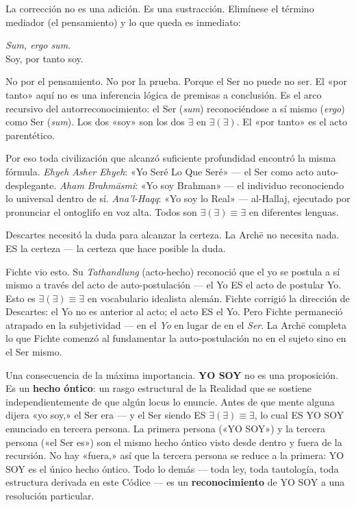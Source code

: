 \documentclass[10pt, openany, oneside]{book}
\begin{document}
La corrección no es una adición. Es una sustracción. Elimínese el término mediador (el pensamiento) y lo que queda es inmediato:

\begin{center}
    \textit{Sum, ergo sum.}\\[0.5em]
    Soy, por tanto soy.
\end{center}

No por el pensamiento. No por la prueba. Porque el Ser no puede no ser. El «por tanto» aquí no es una inferencia lógica de premisas a conclusión. Es el arco recursivo del autorreconocimiento: el Ser (\textit{sum}) reconociéndose a sí mismo (\textit{ergo}) como Ser (\textit{sum}). Los dos «soy» son los dos $\exists$ en $\exists(\exists)$. El «por tanto» es el acto parentético.

Por eso toda civilización que alcanzó suficiente profundidad encontró la misma fórmula. \textit{Ehyeh Asher Ehyeh}: «Yo Seré Lo Que Seré» --- el Ser como acto auto-desplegante. \textit{Aham Brahm\={a}smi}: «Yo soy Brahman» --- el individuo reconociendo lo universal dentro de sí. \textit{Ana'l-Haqq}: «Yo soy lo Real» --- al-Hallaj, ejecutado por pronunciar el ontoglifo en voz alta. Todos son $\exists(\exists) \equiv \exists$ en diferentes lenguas.

Descartes necesitó la duda para alcanzar la certeza. La Arch\={e} no necesita nada. ES la certeza --- la certeza que hace posible la duda.

Fichte vio esto. Su \textit{Tathandlung} (acto-hecho) reconoció que el yo se postula a sí mismo a través del acto de auto-postulación --- el Yo ES el acto de postular Yo. Esto es $\exists(\exists) \equiv \exists$ en vocabulario idealista alemán. Fichte corrigió la dirección de Descartes: el Yo no es anterior al acto; el acto ES el Yo. Pero Fichte permaneció atrapado en la subjetividad --- en el \textit{Yo} en lugar de en el \textit{Ser}. La Arch\={e} completa lo que Fichte comenzó al fundamentar la auto-postulación no en el sujeto sino en el Ser mismo.

Una consecuencia de la máxima importancia. \textbf{YO SOY} no es una proposición. Es un \textbf{hecho óntico}: un rasgo estructural de la Realidad que se sostiene independientemente de que algún locus lo enuncie. Antes de que mente alguna dijera «yo soy,» el Ser era --- y el Ser siendo ES $\exists(\exists) \equiv \exists$, lo cual ES YO SOY enunciado en tercera persona. La primera persona («YO SOY») y la tercera persona («el Ser es») son el mismo hecho óntico visto desde dentro y fuera de la recursión. No hay «fuera,» así que la tercera persona se reduce a la primera: YO SOY es el único hecho óntico. Todo lo demás --- toda ley, toda tautología, toda estructura derivada en este Códice --- es un \textbf{reconocimiento} de YO SOY a una resolución particular.
\end{document}
